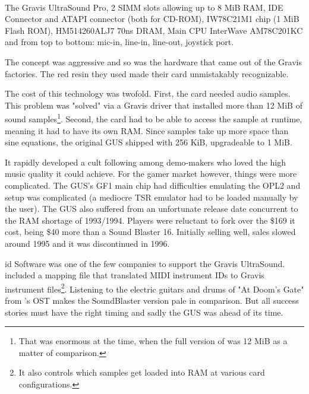 \\
\par
The Gravis UltraSound Pro,  2 SIMM slots allowing up to 8 MiB RAM,  IDE Connector and  ATAPI connector (both for CD-ROM),  IW78C21M1 chip (1 MiB Flash ROM),  HM514260ALJ7 70ns DRAM,  Main CPU InterWave AM78C201KC and  from top to bottom: mic-in, line-in, line-out, joystick port.\\

The concept was aggressive and so was the hardware that came out of the Gravis factories. The red resin they used made their card unmistakably recognizable.\\
\par
The cost of this technology was twofold. First, the card needed audio samples. This problem was "solved" via a Gravis driver that installed more than 12 MiB of sound samples\footnote{That was enormous at the time, when the full version of \doom{} was 12 MiB as a matter of comparison.}. Second, the card had to be able to access the sample at runtime, meaning it had to have its own RAM. Since samples take up more space than sine equations, the original GUS shipped with 256 KiB, upgradeable to 1 MiB.\\
\par
It rapidly developed a cult following among demo-makers who loved the high music quality it could achieve. For the gamer market however, things were more complicated. The GUS's GF1 main chip had difficulties emulating the OPL2 and setup was complicated (a mediocre TSR emulator had to be loaded manually by the user). The GUS also suffered from an unfortunate release date concurrent to the RAM shortage of 1993/1994. Players were reluctant to fork over the \$169 it cost, being \$40 more than a Sound Blaster 16. Initially selling well, sales slowed around 1995 and it was discontinued in 1996.\\
\par
 id Software was one of the few companies to support the Gravis UltraSound. \doom{} included a mapping file that translated MIDI instrument IDs to Gravis  instrument files\footnote{It also controls which samples get loaded into RAM at various card configurations.}. Listening to the electric guitars and drums of "At Doom's Gate" from \doom{}'s OST makes the SoundBlaster version pale in comparison. But all success stories must have the right timing and sadly the GUS was ahead of its time.\vspace{-5pt}

